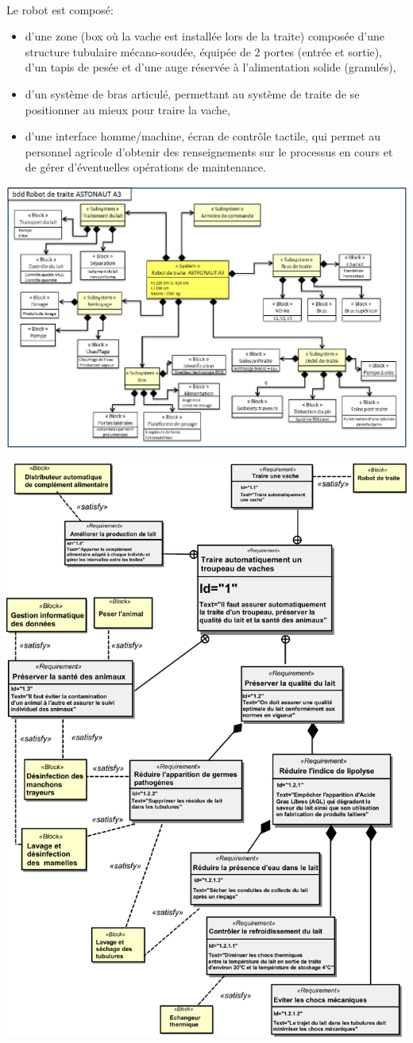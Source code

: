 ~\

Le robot est composé:
\begin{itemize}
 \item d'une zone (box où la vache est installée lors de la traite) composée d'une structure tubulaire mécano-soudée, équipée de 2 portes (entrée et sortie), d'un tapis de pesée et d'une auge réservée à l'alimentation solide (granulés),
 \item d'un système de bras articulé, permettant au système de traite de se positionner au mieux pour traire la vache,
 \item d'une interface homme/machine, écran de contrôle tactile, qui permet au personnel agricole d'obtenir des renseignements sur le processus en cours et de gérer d'éventuelles opérations de maintenance.
\end{itemize}

\begin{center}
 \includegraphics[width=0.7\linewidth]{img/traite_bdd}
\end{center}

\begin{center}
 \includegraphics[width=0.8\linewidth]{img/traite_req}
\end{center}

